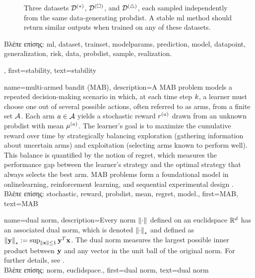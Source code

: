 {{\begin{figure}[H]
			\caption{Three \gls{dataset}s $\mathcal{D}^{(*)}$, $\mathcal{D}^{(\square)}$, and $\mathcal{D}^{(\triangle)}$, 
				each sampled independently from the same \gls{data}-generating \gls{probdist}. A stable \gls{ml} 
				method should return similar outputs when trained on any of these \gls{dataset}s. \label{fig_three_data_stability_dict}}
		\end{figure}
		\foreignlanguage{greek}{Βλέπε επίσης:} \gls{ml}, \gls{dataset}, \gls{trainset}, \gls{modelparams}, \gls{prediction}, 
		\gls{model}, \gls{datapoint}, \gls{generalization}, \gls{risk}, \gls{data}, \gls{probdist}, \gls{sample}, \gls{realization}.}, 
	first={stability}, 
	text={stability} 
}

{name={multi-armed bandit (MAB)},
	description={A MAB problem models 
		a repeated decision-making scenario in which, at each time step $k$, a learner must 
		choose one out of several possible actions, often referred to as arms, from a finite 
		set $\mathcal{A}$. Each arm $a \in \mathcal{A}$ yields a \gls{stochastic} \gls{reward} $r^{(a)}$ 
		drawn from an unknown \gls{probdist} with \gls{mean} $\mu^{(a)}$. 
		The learner’s goal is to maximize the cumulative \gls{reward} over time by 
		strategically balancing exploration (gathering information about 
		uncertain arms) and exploitation (selecting arms known to perform well). 
		This balance is quantified by the notion of \gls{regret}, which measures the performance 
		gap between the learner's strategy and the optimal strategy that always selects the best arm. 
		MAB problems form a foundational \gls{model} in \gls{onlinelearning}, reinforcement learning, 
		and sequential experimental design \cite{Bubeck2012}.\\
		\foreignlanguage{greek}{Βλέπε επίσης:} \gls{stochastic}, \gls{reward}, \gls{probdist}, \gls{mean}, \gls{regret}, \gls{model}.},
	first={MAB},
	text={MAB}
}

{name={dual norm},
	description={Every \gls{norm} $\left\Vert {\cdot} \right\Vert_{}$ defined on an \gls{euclidspace} $\mathbb{R}^{d}$ 
		has an associated dual \gls{norm}, which is denoted $\left\Vert {\cdot} \right\Vert_{*}$ and defined as 
		$\left\Vert {{\bf y}} \right\Vert_{*} := \sup_{\Vert {{\bf x}} \Vert{} \le 1} {\bf y}^{T} {\bf x}$. 
		The dual \gls{norm} measures the largest possible inner product between ${\bf y}$ 
		and any vector in the unit ball of the original \gls{norm}. For further details, see 
		\cite[Sec.~A.1.6]{BoydConvexBook}.\\
		\foreignlanguage{greek}{Βλέπε επίσης:} \gls{norm}, \gls{euclidspace}.},
	first={dual norm},
	text={dual norm}
}

